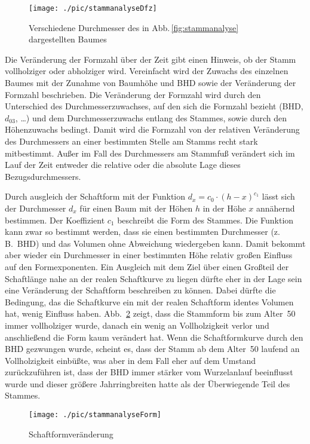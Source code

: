 \documentclass[twocolumn]{scrartcl}
\begin{document}
\begin{figure}[htbp]
  \centering
  \texttt{[image: ./pic/stammanalyseDfz]}
  \caption{Verschiedene Durchmesser des in Abb.\,\ref{fig:stammanalyse}
  dargestellten Baumes}
  \label{fig:stammanalyseDfz}
\end{figure}

Die Veränderung der Formzahl über der Zeit gibt einen Hinweis, ob der Stamm
vollholziger oder abholziger wird. Vereinfacht wird der Zuwachs des einzelnen
Baumes mit der Zunahme von Baumhöhe und BHD sowie der Veränderung der Formzahl
beschrieben. Die Veränderung der Formzahl wird durch den Unterschied des
Durchmesserzuwachses, auf den sich die Formzahl bezieht (BHD, $d_{03}$, \dots)
und dem Durchmesserzuwachs entlang des Stammes, sowie durch den Höhenzuwachs
bedingt. Damit wird die Formzahl von der relativen Veränderung des Durchmessers
an einer bestimmten Stelle am Stamms recht stark mitbestimmt. Außer im Fall des
Durchmessers am Stammfuß verändert sich im Lauf der Zeit entweder die relative
oder die absolute Lage dieses Bezugsdurchmessers.

Durch ausgleich der Schaftform mit der Funktion $d_x = c_0 \cdot (h - x)^{c_1}$
lässt sich der Durchmesser $d_x$ für einen Baum mit der Höhen $h$ in der Höhe
$x$ annähernd bestimmen. Der Koeffizient $c_1$ beschreibt die Form des Stammes.
Die Funktion kann zwar so bestimmt werden, dass sie einen bestimmten Durchmesser
(z.\,B.\ BHD) und das Volumen ohne Abweichung wiedergeben kann. Damit bekommt
aber wieder ein Durchmesser in einer bestimmten Höhe relativ großen Einfluss auf
den Formexponenten. Ein Ausgleich mit dem Ziel über einen Großteil der
Schaftlänge nahe an der realen Schaftkurve zu liegen dürfte eher in der Lage
sein eine Veränderung der Schaftform beschreiben zu können. Dabei dürfte die
Bedingung, das die Schaftkurve ein mit der realen Schaftform identes Volumen
hat, wenig Einfluss haben. Abb.~\ref{fig:stammanalyseForm} zeigt, dass die
Stammform bis zum Alter~50 immer vollholziger wurde, danach ein wenig an
Vollholzigkeit verlor und anschließend die Form kaum verändert hat. Wenn die
Schaftformkurve durch den BHD gezwungen wurde, scheint es, dass der Stamm ab dem
Alter~50 laufend an Vollholzigkeit einbüßte, was aber in dem Fall eher auf dem
Umstand zurückzuführen ist, dass der BHD immer stärker vom Wurzelanlauf
beeinflusst wurde und dieser größere Jahrringbreiten hatte als der Überwiegende
Teil des Stammes.

\begin{figure}[htbp]
  \centering
  \texttt{[image: ./pic/stammanalyseForm]}
  \caption{Schaftformveränderung}
  \label{fig:stammanalyseForm}
\end{figure}
\end{document}

